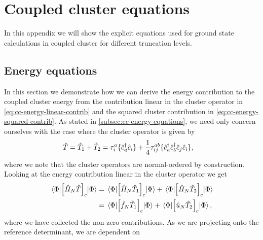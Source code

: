 \chapter{Coupled cluster equations}
    In this appendix we will show the explicit equations used for ground state
    calculations in coupled cluster for different truncation levels.

    \section{Energy equations}
        \label{app:cc-energy-equations}
        In this section we demonstrate how we can derive the energy contribution
        to the coupled cluster energy from the contribution linear in the
        cluster operator in \autoref{eq:cc-energy-linear-contrib} and the squared
        cluster contribution in \autoref{eq:cc-energy-squared-contrib}.
        As stated in \autoref{subsec:cc-energy-equations}, we need only concern
        ourselves with the case where the cluster operator is given by
        \begin{align}
            \hat{T}
            &= \hat{T}_1 + \hat{T}_2
            = \tau^{a}_{i}\{ \hat{c}_{a}^{\dagger}\hat{c}_{i} \}
            + \frac{1}{4}\tau^{ab}_{ij}
            \{ \hat{c}_{a}^{\dagger}\hat{c}_{b}^{\dagger}\hat{c}_{j}\hat{c}_{i} \},
        \end{align}
        where we note that the cluster operators are normal-ordered by
        construction.
        Looking at the energy contribution linear in the cluster operator we get
        \begin{align}
            \mel{\Phi}{
                \left[ 
                    \hat{H}_N
                    \hat{T}\right]_c
            }{\Phi}
            &=
            \mel{\Phi}{
                \left[ 
                    \hat{H}_N
                    \hat{T}_1
                 \right]_c
            }{\Phi}
            + \mel{\Phi}{
                \left[ 
                    \hat{H}_N
                    \hat{T}_2
                 \right]_c
            }{\Phi}
            \\
            &=
            \mel{\Phi}{
                \left[ 
                    \hat{f}_N
                    \hat{T}_1
                 \right]_c
            }{\Phi}
            + \mel{\Phi}{
                \left[ 
                    \hat{u}_N
                    \hat{T}_2
                 \right]_c
            }{\Phi},
        \end{align}
        where we have collected the non-zero contributions.
        As we are projecting onto the reference determinant, we are dependent on

